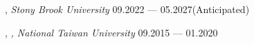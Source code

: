 


, \textit{Stony Brook University} 	\hfill 09.2022 --- 05.2027(Anticipated)

, \textit{, National Taiwan University} \hfill	09.2015 --- 01.2020


